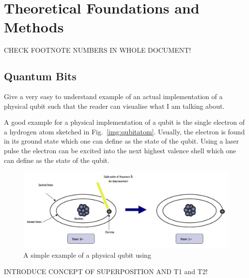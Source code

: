 \chapter{Theoretical Foundations and Methods}\label{sec:theoryandmethods}

CHECK FOOTNOTE NUMBERS IN WHOLE DOCUMENT!
\section{Quantum Bits}
\label{subsec:qubits}

Give a very easy to understand example of an actual implementation of a physical qubit such that the reader can visualise what I am talking about.

A good example for a physical implementation of a qubit is the single electron of a hydrogen atom sketched in Fig.~\ref{img:qubitatom}. Usually, the electron is found in its ground state which one can define as the \0 state of the qubit. Using a laser pulse the electron can be excited into the next highest valence shell which one can define as the \1 state of the qubit. 

\begin{figure}[!ht]
       \centering
       \includegraphics[scale=0.07]{img/qubitimplementation.jpeg}
       \caption{\label{fig:qubitatom} A simple example of a physical qubit using}
\end{figure}


INTRODUCE CONCEPT OF SUPERPOSITION AND T1 and T2!

